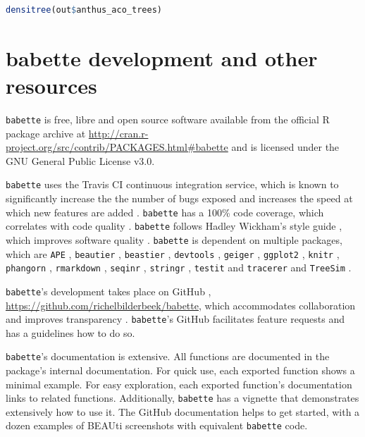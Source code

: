 \documentclass{article}
\begin{document}
\begin{lstlisting}[language=R, floatplacement=H]
densitree(out$anthus_aco_trees)
\end{lstlisting}

\section{babette development and other resources}

\verb;babette; is free, libre and open source software available from the official R package archive at 
\url{http://cran.r-project.org/src/contrib/PACKAGES.html\#babette}
and is licensed under the GNU General Public License v3.0.

\verb;babette; uses the Travis CI \cite{travis} 
continuous integration service, which is known to significantly 
increase the the number of bugs exposed \cite{vasilescu2015} and increases
the speed at which new features are added \cite{vasilescu2015}.
\verb;babette; has a 100\% code coverage, which correlates with code quality \cite{horgan1994,del1995correlation}. 
\verb;babette; follows Hadley Wickham's style guide \cite{style_guide}, which improves software quality \cite{fang2001}.
\verb;babette; is dependent on multiple packages, which are 
\verb;APE; \cite{APE}, 
\verb;beautier; \cite{beautier},
\verb;beastier; \cite{beastier},
\verb;devtools; \cite{devtools},
\verb;geiger; \cite{GEIGER},
\verb;ggplot2; \cite{ggplot2},
\verb;knitr; \cite{knitr},
\verb;phangorn; \cite{phangorn},
\verb;rmarkdown; \cite{rmarkdown},
\verb;seqinr; \cite{seqinr},
\verb;stringr; \cite{stringr},
\verb;testit; \cite{testit} and 
\verb;tracerer; \cite{tracerer} and
\verb;TreeSim; \cite{TreeSim}.

\verb;babette;'s development takes place on GitHub \cite{github},
\url{https://github.com/richelbilderbeek/babette}, 
which accommodates collaboration \cite{perez2016ten} 
and improves transparency \cite{gorgolewski2016practical}.
\verb;babette;'s GitHub facilitates feature requests and has a guidelines how to do so.

\verb;babette;'s documentation is extensive. All functions are documented
in the package's internal documentation. For quick use, 
each exported function shows a minimal example. 
For easy exploration, each exported function's documentation links to related functions.
Additionally, \verb;babette; has a vignette that demonstrates extensively how
to use it. The GitHub documentation helps to get started, with a dozen examples 
of BEAUti screenshots with equivalent \verb;babette; code.
\end{document}
